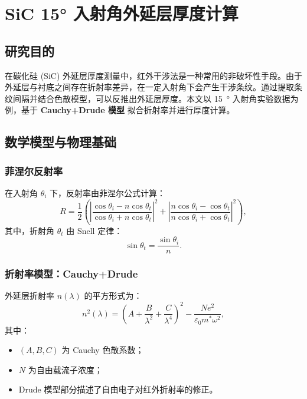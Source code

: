 \section{SiC 15° 入射角外延层厚度计算}

\subsection{研究目的}
在碳化硅 (SiC) 外延层厚度测量中，红外干涉法是一种常用的非破坏性手段。由于外延层与衬底之间存在折射率差异，在一定入射角下会产生干涉条纹。通过提取条纹间隔并结合色散模型，可以反推出外延层厚度。本文以 \SI{15}{\degree} 入射角实验数据为例，基于 \textbf{Cauchy+Drude 模型} 拟合折射率并进行厚度计算。

\subsection{数学模型与物理基础}

\subsubsection{菲涅尔反射率}
在入射角 $\theta_i$ 下，反射率由菲涅尔公式计算：
\begin{equation}
R = \frac{1}{2}\left( 
\left|\frac{\cos\theta_i - n \cos\theta_t}{\cos\theta_i + n \cos\theta_t}\right|^2 
+ 
\left|\frac{n\cos\theta_i - \cos\theta_t}{n\cos\theta_i + \cos\theta_t}\right|^2 
\right),
\end{equation}
其中，折射角 $\theta_t$ 由 Snell 定律：
\begin{equation}
\sin\theta_t = \frac{\sin\theta_i}{n}.
\end{equation}

\subsubsection{折射率模型：Cauchy+Drude}
外延层折射率 $n(\lambda)$ 的平方形式为：
\begin{equation}
n^2(\lambda) = \left(A + \frac{B}{\lambda^2} + \frac{C}{\lambda^4}\right)^2 - \frac{Ne^2}{\varepsilon_0 m^\ast \omega^2},
\end{equation}
其中：
\begin{itemize}
    \item $(A, B, C)$ 为 Cauchy 色散系数；
    \item $N$ 为自由载流子浓度；
    \item Drude 模型部分描述了自由电子对红外折射率的修正。
\end{itemize}

